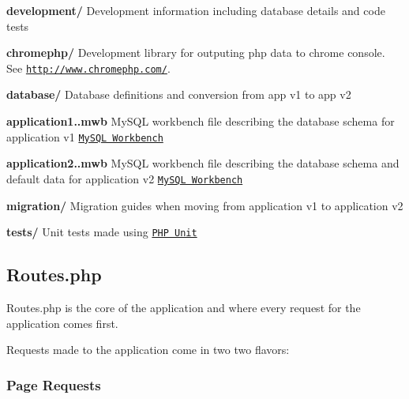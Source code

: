 \begin{DoxyItemize}
\item {\bfseries development/} Development information including database details and code tests


\begin{DoxyItemize}
\item {\bfseries chromephp/} Development library for outputing php data to chrome console. See \href{http://www.chromephp.com/}{\tt http\-://www.\-chromephp.\-com/}.
\item {\bfseries database/} Database definitions and conversion from app v1 to app v2


\begin{DoxyItemize}
\item {\bfseries application1..\-mwb} My\-S\-Q\-L workbench file describing the database schema for application v1 \href{http://dev.mysql.com/downloads/workbench/}{\tt My\-S\-Q\-L Workbench}
\item {\bfseries application2..\-mwb} My\-S\-Q\-L workbench file describing the database schema and default data for application v2 \href{http://dev.mysql.com/downloads/workbench/}{\tt My\-S\-Q\-L Workbench}
\end{DoxyItemize}
\end{DoxyItemize}


\begin{DoxyItemize}
\item {\bfseries migration/} Migration guides when moving from application v1 to application v2
\end{DoxyItemize}


\begin{DoxyItemize}
\item {\bfseries tests/} Unit tests made using \href{http://www.phpunit.de/manual/current/en/index.html}{\tt P\-H\-P Unit}
\end{DoxyItemize}
\end{DoxyItemize}

\subsection*{Routes.\-php}

Routes.\-php is the core of the application and where every request for the application comes first.

Requests made to the application come in two two flavors\-:

\subsubsection*{Page Requests}

